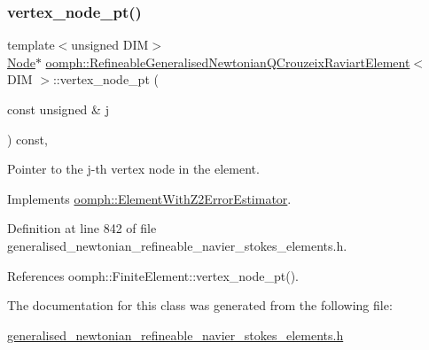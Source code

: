 \subsubsection{\texorpdfstring{vertex\+\_\+node\+\_\+pt()}{vertex\_node\_pt()}}
{\footnotesize\ttfamily template$<$unsigned D\+IM$>$ \\
\hyperlink{classoomph_1_1Node}{Node}$\ast$ \hyperlink{classoomph_1_1RefineableGeneralisedNewtonianQCrouzeixRaviartElement}{oomph\+::\+Refineable\+Generalised\+Newtonian\+Q\+Crouzeix\+Raviart\+Element}$<$ D\+IM $>$\+::vertex\+\_\+node\+\_\+pt (\begin{DoxyParamCaption}\item[{const unsigned \&}]{j }\end{DoxyParamCaption}) const\hspace{0.3cm}{\ttfamily [inline]}, {\ttfamily [virtual]}}



Pointer to the j-\/th vertex node in the element. 



Implements \hyperlink{classoomph_1_1ElementWithZ2ErrorEstimator_a0eedccc33519f852c5dc2055ddf2774b}{oomph\+::\+Element\+With\+Z2\+Error\+Estimator}.



Definition at line 842 of file generalised\+\_\+newtonian\+\_\+refineable\+\_\+navier\+\_\+stokes\+\_\+elements.\+h.



References oomph\+::\+Finite\+Element\+::vertex\+\_\+node\+\_\+pt().



The documentation for this class was generated from the following file\+:\begin{DoxyCompactItemize}
\item 
\hyperlink{generalised__newtonian__refineable__navier__stokes__elements_8h}{generalised\+\_\+newtonian\+\_\+refineable\+\_\+navier\+\_\+stokes\+\_\+elements.\+h}\end{DoxyCompactItemize}
